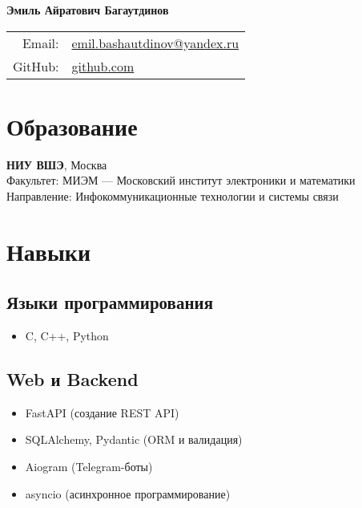 \documentclass[a4paper,12pt]{article}
\begin{document}
	
	\begin{center}
		\Large\textbf{Эмиль Айратович Багаутдинов} \\
		\normalsize
		\vspace{5pt}
		\begin{tabular}{rl}
			Email: & \href{mailto:emil.bashautdinov@yandex.ru}{emil.bashautdinov@yandex.ru} \\
			GitHub: & \href{https://github.com/dmngwtf}{github.com} \\
		\end{tabular}
	\end{center}
	
	\vspace{10pt}
	
	\section*{Образование}
	\textbf{НИУ ВШЭ}, Москва \\
	Факультет: МИЭМ — Московский институт электроники и математики \\
	Направление: Инфокоммуникационные технологии и системы связи
	
	\vspace{10pt}
	
	\section*{Навыки}
	
	\subsection*{Языки программирования}
	\begin{itemize}[leftmargin=1.5em]
		\item C, C++, Python
	\end{itemize}
	
	\subsection*{Web и Backend}
	\begin{itemize}[leftmargin=1.5em]
		\item FastAPI (создание REST API)
		\item SQLAlchemy, Pydantic (ORM и валидация)
		\item Aiogram (Telegram-боты)
		\item asyncio (асинхронное программирование)
	\end{itemize}
	
\end{document}
